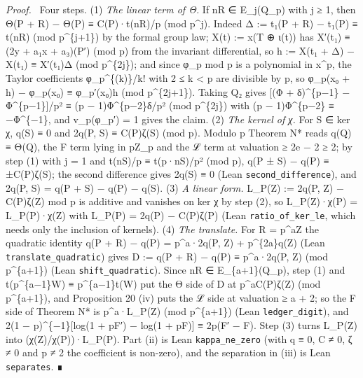 \documentclass[11pt,a4paper]{article}
\theoremstyle{named}
\newenvironment{mdproof}[1][Proof]{\par\medskip\noindent\textit{#1.}\ }{\par\medskip}
\begin{document}
\begin{mdproof}[Proof]
Four steps. (1) \textit{The linear term of Θ.} If nR ∈ E\_j(Q\_p) with j ≥ 1, then Θ(P + R) − Θ(P) ≡ C(P)·t(nR)/p (mod p\textasciicircum{}j). Indeed Δ := t₁(P + R) − t₁(P) ≡ t(nR) (mod p\textasciicircum{}\{j+1\}) by the formal group law; X(t) := x(T ⊕ ι(t)) has X′(t₁) ≡ (2y + a₁x + a₃)(P′) (mod p) from the invariant differential, so h := X(t₁ + Δ) − X(t₁) ≡ X′(t₁)Δ (mod p\textasciicircum{}\{2j\}); and since φ\_p mod p is a polynomial in x\textasciicircum{}p, the Taylor coefficients φ\_p\textasciicircum{}\{(k)\}/k! with 2 ≤ k \textless{} p are divisible by p, so φ\_p(x₀ + h) − φ\_p(x₀) ≡ φ\_p′(x₀)h (mod p\textasciicircum{}\{2j+1\}). Taking Q₂ gives [(Φ + δ)\textasciicircum{}\{p−1\} − Φ\textasciicircum{}\{p−1\}]/p² ≡ (p − 1)Φ\textasciicircum{}\{p−2\}δ/p² (mod p\textasciicircum{}\{2j\}) with (p − 1)Φ\textasciicircum{}\{p−2\} ≡ −Φ\textasciicircum{}\{−1\}, and v\_p(φ\_p′) = 1 gives the claim. (2) \textit{The kernel of χ.} For S ∈ ker χ, q(S) ≡ 0 and 2q(P, S) ≡ C(P)ζ(S) (mod p). Modulo p Theorem N* reads q(Q) ≡ Θ(Q), the F term lying in pZ\_p and the ℒ term at valuation ≥ 2e − 2 ≥ 2; by step (1) with j = 1 and t(nS)/p ≡ t(p·nS)/p² (mod p), q(P ± S) − q(P) ≡ ±C(P)ζ(S); the second difference gives 2q(S) ≡ 0 (Lean \texttt{second\_\allowbreak{}difference}), and 2q(P, S) = q(P + S) − q(P) − q(S). (3) \textit{A linear form.} L\_P(Z) := 2q(P, Z) − C(P)ζ(Z) mod p is additive and vanishes on ker χ by step (2), so L\_P(Z)·χ(P) = L\_P(P)·χ(Z) with L\_P(P) = 2q(P) − C(P)ζ(P) (Lean \texttt{ratio\_\allowbreak{}of\_\allowbreak{}ker\_\allowbreak{}le}, which needs only the inclusion of kernels). (4) \textit{The translate.} For R = p\textasciicircum{}aZ the quadratic identity q(P + R) − q(P) = p\textasciicircum{}a·2q(P, Z) + p\textasciicircum{}\{2a\}q(Z) (Lean \texttt{translate\_\allowbreak{}quadratic}) gives D := q(P + R) − q(P) ≡ p\textasciicircum{}a·2q(P, Z) (mod p\textasciicircum{}\{a+1\}) (Lean \texttt{shift\_\allowbreak{}quadratic}). Since nR ∈ E\_\{a+1\}(Q\_p), step (1) and t(p\textasciicircum{}\{a−1\}W) ≡ p\textasciicircum{}\{a−1\}t(W) put the Θ side of D at p\textasciicircum{}aC(P)ζ(Z) (mod p\textasciicircum{}\{a+1\}), and Proposition 20 (iv) puts the ℒ side at valuation ≥ a + 2; so the F side of Theorem N* is p\textasciicircum{}a·L\_P(Z) (mod p\textasciicircum{}\{a+1\}) (Lean \texttt{ledger\_\allowbreak{}digit}), and 2(1 − p)\textasciicircum{}\{−1\}[log(1 + pF′) − log(1 + pF)] ≡ 2p(F′ − F). Step (3) turns L\_P(Z) into (χ(Z)/χ(P))·L\_P(P). Part (ii) is Lean \texttt{kappa\_\allowbreak{}ne\_\allowbreak{}zero} (with q ≡ 0, C ≠ 0, ζ ≠ 0 and p ≠ 2 the coefficient is non-zero), and the separation in (iii) is Lean \texttt{separates}. ∎
\end{mdproof}
\end{document}

